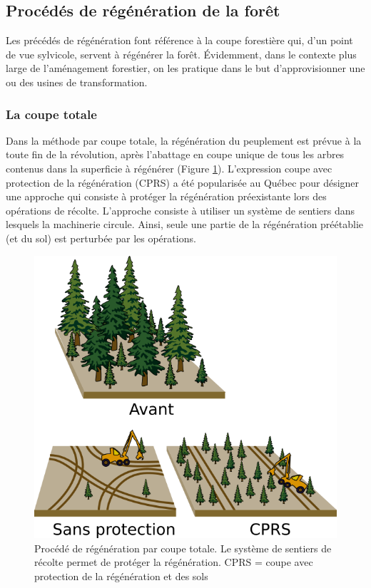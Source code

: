 \subsection{Procédés de régénération de la forêt}
Les \og précédés de régénération \fg font référence à la coupe forestière qui, d'un point de vue sylvicole, servent à régénérer la forêt. Évidemment, dans le contexte plus large de l'aménagement forestier, on les pratique dans le but d'approvisionner une ou des usines de transformation.

\subsubsection{La coupe totale}\label{cprs}

Dans la méthode par coupe totale, la régénération du peuplement est prévue à la toute fin de la révolution, après l'abattage en coupe unique de tous les arbres contenus dans la superficie à régénérer (Figure \ref{fig:CPRS}). L'expression \og coupe avec protection de la régénération (CPRS) a été popularisée au Québec pour désigner une approche qui consiste à protéger la régénération préexistante lors des opérations de récolte. L'approche consiste à utiliser un système de sentiers dans lesquels la machinerie circule. Ainsi, seule une partie de la régénération préétablie (et du sol) est perturbée par les opérations.\\

\begin{figure}[!h]
\centering
\includegraphics[width=0.7\linewidth]{./img/ch8_CPRS}
\caption{Procédé de régénération par coupe totale. Le système de sentiers de récolte permet de protéger la régénération. CPRS = coupe avec protection de la régénération et des sols}
\label{fig:CPRS}
\end{figure}

